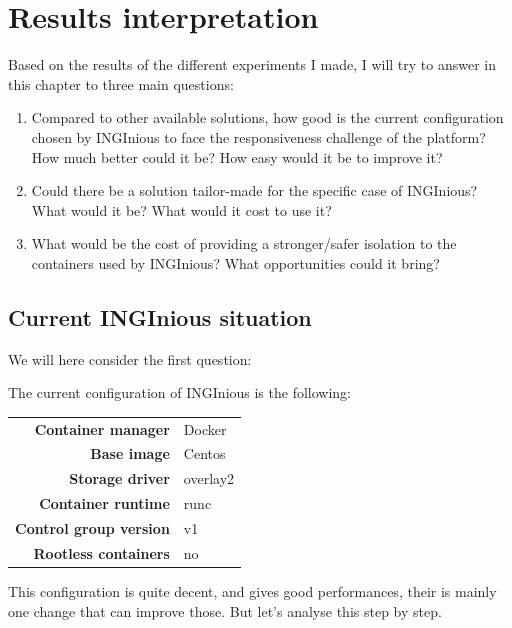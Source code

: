 \chapter{Results interpretation}

Based on the results of the different experiments I made, I will try to answer in this chapter to three main questions:
\begin{enumerate}
  \item Compared to other available solutions, how good is the current configuration chosen by INGInious to face the responsiveness challenge of the platform?  How much better could it be?  How easy would it be to improve it?
  \item Could there be a solution tailor-made for the specific case of INGInious?  What would it be?  What would it cost to use it?
  \item What would be the cost of providing a stronger/safer isolation to the containers used by INGInious?  What opportunities could it bring?
\end{enumerate}

\section{Current INGInious situation}
We will here consider the first question:
\begin{center}
\end{center}

The current configuration of INGInious is the following:
\begin{center}
\begin{tabular}{rl}
  \textbf{Container manager} & Docker \\
  \textbf{Base image} & Centos \\
  \textbf{Storage driver} & overlay2 \\
  \textbf{Container runtime} & runc \\
  \textbf{Control group version} & v1 \\
  \textbf{Rootless containers} & no \\
\end{tabular}
\end{center}

This configuration is quite decent, and gives good performances, their is mainly one change that can improve those.  But let's analyse this step by step.

